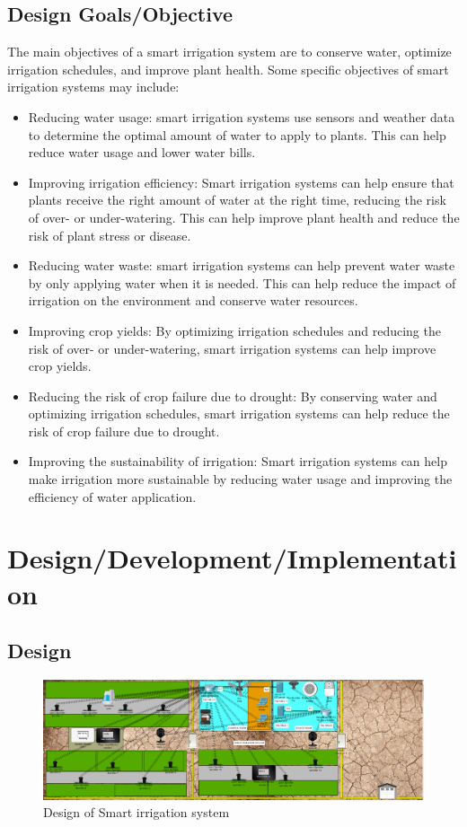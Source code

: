 \documentclass{report}
\begin{document}
\section{Design Goals/Objective}
The main objectives of a smart irrigation system are to conserve water, optimize irrigation schedules, and improve plant health. Some specific objectives of smart irrigation systems may include:\\
\begin{itemize}
    \item Reducing water usage: smart irrigation systems use sensors and weather data to determine the optimal amount of water to apply to plants. This can help reduce water usage and lower water bills.
    \item Improving irrigation efficiency: Smart irrigation systems can help ensure that plants receive the right amount of water at the right time, reducing the risk of over- or under-watering. This can help improve plant health and reduce the risk of plant stress or disease.
    \item Reducing water waste: smart irrigation systems can help prevent water waste by only applying water when it is needed. This can help reduce the impact of irrigation on the environment and conserve water resources.
    \item Improving crop yields: By optimizing irrigation schedules and reducing the risk of over- or under-watering, smart irrigation systems can help improve crop yields.
    \item Reducing the risk of crop failure due to drought: By conserving water and optimizing irrigation schedules, smart irrigation systems can help reduce the risk of crop failure due to drought.
    \item Improving the sustainability of irrigation: Smart irrigation systems can help make irrigation more sustainable by reducing water usage and improving the efficiency of water application.
\end{itemize}
\vspace{2cm}
\chapter{Design/Development/Implementation}
\section{Design}
\begin{figure}[h]
    \centering
\includegraphics[width=15cm]{Design.png}
\caption{Design of Smart irrigation system}
\end{figure}
\end{document}
